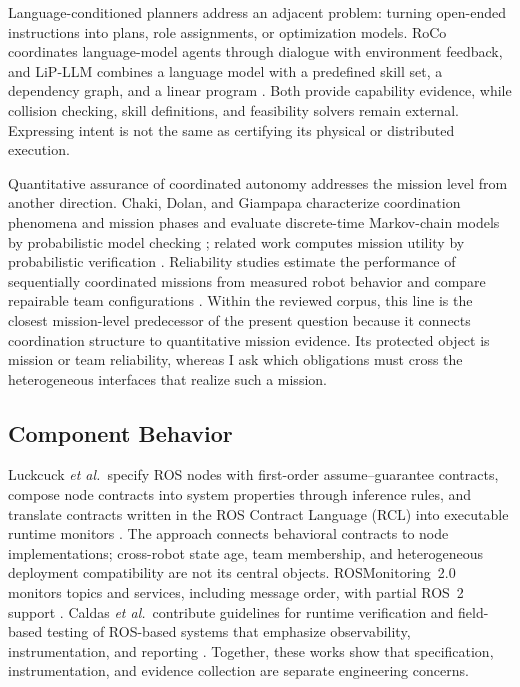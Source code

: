 Language-conditioned planners address an adjacent problem: turning open-ended
instructions into plans, role assignments, or optimization models.  RoCo
coordinates language-model agents through dialogue with environment feedback,
and LiP-LLM combines a language model with a predefined skill set, a dependency
graph, and a linear program \cite{mandi2024roco,obata2025lipllm}.  Both provide
capability evidence, while collision checking, skill definitions, and
feasibility solvers remain external.  Expressing intent is not the same as
certifying its physical or distributed execution.

Quantitative assurance of coordinated autonomy addresses the mission level from
another direction.  Chaki, Dolan, and Giampapa characterize coordination
phenomena and mission phases and evaluate discrete-time Markov-chain models by
probabilistic model checking \cite{chaki2013assurance}; related work computes
mission utility by probabilistic verification \cite{chaki2013probabilistic}.
Reliability studies estimate the performance of sequentially coordinated
missions from measured robot behavior and compare repairable team
configurations \cite{porter2013reliability,stancliff2006missionreliability}.
Within the reviewed corpus, this line is the closest mission-level predecessor
of the present question because it connects coordination structure to
quantitative mission evidence.  Its protected object is mission or team
reliability, whereas I ask which obligations must cross the heterogeneous
interfaces that realize such a mission.

\subsection{Component Behavior}

Luckcuck \emph{et al.}\ specify ROS nodes with first-order assume--guarantee
contracts, compose node contracts into system properties through inference
rules, and translate contracts written in the ROS Contract Language (RCL) into
executable runtime monitors \cite{luckcuck2026compositional}.  The approach
connects behavioral contracts to node implementations; cross-robot state age,
team membership, and heterogeneous deployment compatibility are not its central
objects.  ROSMonitoring~2.0 monitors topics and services, including message
order, with partial ROS~2 support \cite{ghaffari2024rosmonitoring}.  Caldas
\emph{et al.}\ contribute guidelines for runtime verification and field-based
testing of ROS-based systems that emphasize observability, instrumentation, and
reporting \cite{caldas2024rvft}.  Together, these works show that
specification, instrumentation, and evidence collection are separate
engineering concerns.


